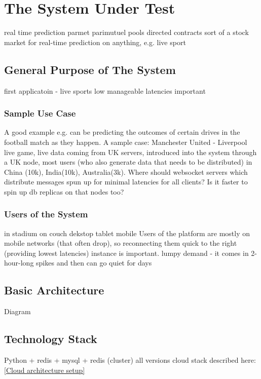 \documentclass{uvamscse}
\begin{document}

\chapter{The System Under Test}\label{The System Under Test}

real time prediction parmet
parimutuel pools
directed contracts
sort of a stock market for real-time prediction on anything, e.g. live sport

\section{General Purpose of The System}
first applicatoin - live sports
low manageable latencies important

\subsection{Sample Use Case}
A good example e.g. can be predicting the outcomes of certain drives in the football match as they happen. A sample case: Manchester United - Liverpool live game, live data coming from UK servers, introduced into the system through a UK node, most users (who also generate data that needs to be distributed) in China (10k), India(10k), Australia(3k). Where should websocket servers which distribute messages spun up for minimal latencies for all clients? Is it faster to spin up db replicas on that nodes too?

\subsection{Users of the System}
in stadium
on couch
dekstop
tablet
mobile
Users of the platform are mostly on mobile networks (that often drop), so reconnecting them quick to the right (providing lowest latencies) instance is important.
lumpy demand - it comes in 2-hour-long spikes and then can go quiet for days

\section{Basic Architecture}

Diagram

\section{Technology Stack} \label{Technology Stack}
Python + redis + mysql + redis (cluster) all versions
cloud stack described here: \ref{Cloud architecture setup}
\end{document}
